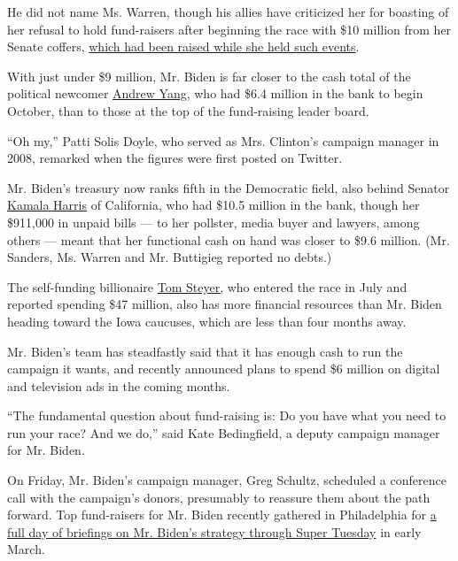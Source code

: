He did not name Ms. Warren, though his allies have criticized her for
boasting of her refusal to hold fund-raisers after beginning the race
with \$10 million from her Senate coffers,
\href{https://www.nytimes.com/2019/09/09/us/politics/elizabeth-warren-2020.html?module=inline}{which
had been raised while she held such events}.

With just under \$9 million, Mr. Biden is far closer to the cash total
of the political newcomer
\href{https://www.nytimes.com/interactive/2020/us/elections/andrew-yang.html}{Andrew
Yang}, who had \$6.4 million in the bank to begin October, than to those
at the top of the fund-raising leader board.

``Oh my,'' Patti Solis Doyle, who served as Mrs. Clinton's campaign
manager in 2008, remarked when the figures were first posted on Twitter.

Mr. Biden's treasury now ranks fifth in the Democratic field, also
behind Senator
\href{https://www.nytimes.com/interactive/2020/us/elections/kamala-harris.html}{Kamala
Harris} of California, who had \$10.5 million in the bank, though her
\$911,000 in unpaid bills --- to her pollster, media buyer and lawyers,
among others --- meant that her functional cash on hand was closer to
\$9.6 million. (Mr. Sanders, Ms. Warren and Mr. Buttigieg reported no
debts.)

The self-funding billionaire
\href{https://www.nytimes.com/interactive/2020/us/elections/tom-steyer.html}{Tom
Steyer,} who entered the race in July and reported spending \$47
million, also has more financial resources than Mr. Biden heading toward
the Iowa caucuses, which are less than four months away.

Mr. Biden's team has steadfastly said that it has enough cash to run the
campaign it wants, and recently announced plans to spend \$6 million on
digital and television ads in the coming months.

``The fundamental question about fund-raising is: Do you have what you
need to run your race? And we do,'' said Kate Bedingfield, a deputy
campaign manager for Mr. Biden.

On Friday, Mr. Biden's campaign manager, Greg Schultz, scheduled a
conference call with the campaign's donors, presumably to reassure them
about the path forward. Top fund-raisers for Mr. Biden recently gathered
in Philadelphia for
\href{https://www.nytimes.com/2019/10/05/us/politics/biden-donors.html}{a
full day of briefings on Mr. Biden's strategy through Super Tuesday} in
early March.

